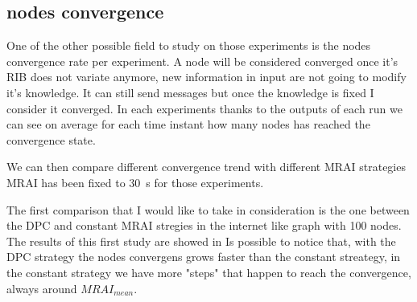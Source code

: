 \documentclass[10pt,conference,letterpaper]{IEEEtran}
\begin{document}
\subsection{nodes convergence}

One of the other possible field to study on those experiments is the nodes
convergence rate per experiment.
A node will be considered converged once it's RIB does not variate anymore,
new information in input are not going to modify it's knowledge.
It can still send messages but once the knowledge is fixed I consider it converged.
In each experiments thanks to the outputs of each run we can see on average
for each time instant how many nodes has reached the convergence state.

We can then compare different convergence trend with different \ac{MRAI} strategies
\ac{MRAI} has been fixed to \SI{30}{\second} for those experiments.

The first comparison that I would like to take in consideration is the one
between the \ac{DPC} and constant \ac{MRAI} stregies in the internet like graph
with \num{100} nodes.
The results of this first study are showed in 
Is possible to notice that, with the \ac{DPC} strategy the nodes convergens grows
faster than the constant streategy, in the constant strategy we have more "steps"
that happen to reach the convergence, always around $MRAI_{mean}$.
\end{document}
